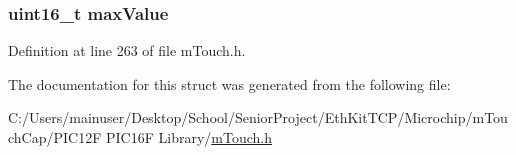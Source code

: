 \subsubsection[{max\+Value}]{\setlength{\rightskip}{0pt plus 5cm}uint16\+\_\+t max\+Value}\label{structm_touch___most_pressed_data_a43e908ef446b8955bd26ea7c5a246ceb}


Definition at line 263 of file m\+Touch.\+h.



The documentation for this struct was generated from the following file\+:\begin{DoxyCompactItemize}
\item 
C\+:/\+Users/mainuser/\+Desktop/\+School/\+Senior\+Project/\+Eth\+Kit\+T\+C\+P/\+Microchip/m\+Touch\+Cap/\+P\+I\+C12\+F P\+I\+C16\+F Library/\hyperlink{m_touch_cap_2_p_i_c12_f_01_p_i_c16_f_01_library_2m_touch_8h}{m\+Touch.\+h}\end{DoxyCompactItemize}
